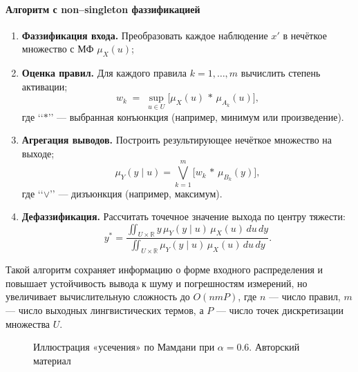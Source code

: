 \paragraph{Алгоритм с non–singleton фаззификацией}
\begin{enumerate}
  \item \textbf{Фаззификация входа.} Преобразовать каждое наблюдение $x'$ в нечёткое множество с МФ $\mu_X(u)$;
  \item \textbf{Оценка правил.} Для каждого правила $k=1,\dots,m$ вычислить степень активации;
  \[
    w_k \;=\;\sup_{u\in U}\bigl[\mu_X(u)\,\ast\,\mu_{A_k}(u)\bigr],
  \]
  где ‘‘$\ast$’’ — выбранная конъюнкция (например, минимум или произведение).
  \item \textbf{Агрегация выводов.} Построить результирующее нечёткое множество на выходе;
  \[
    \mu_Y(y\mid u)
    = \bigvee_{k=1}^{m}\bigl[w_k \,\ast\, \mu_{B_k}(y)\bigr],
  \]
  где ‘‘$\vee$’’ — дизъюнкция (например, максимум).
  \item \textbf{Дефаззификация.} Рассчитать точечное значение выхода по центру тяжести:
  \[
    y^* 
    = 
    \frac{\displaystyle\iint_{U\times\mathbb R}
      y\,\mu_Y(y\mid u)\,\mu_X(u)\,du\,dy}
         {\displaystyle\iint_{U\times\mathbb R}
      \mu_Y(y\mid u)\,\mu_X(u)\,du\,dy}.
  \]
\end{enumerate}

Такой алгоритм сохраняет информацию о форме входного распределения и повышает устойчивость вывода к шуму и погрешностям измерений, но увеличивает вычислительную сложность до $O(nmP)$, где $n$ — число правил, $m$ — число выходных лингвистических термов, а $P$ — число точек дискретизации множества $U$.

\begin{figure}[H]
  \centering
  \caption{Иллюстрация «усечения» по Мамдани при $\alpha=0.6$. Авторский материал}
\end{figure}



